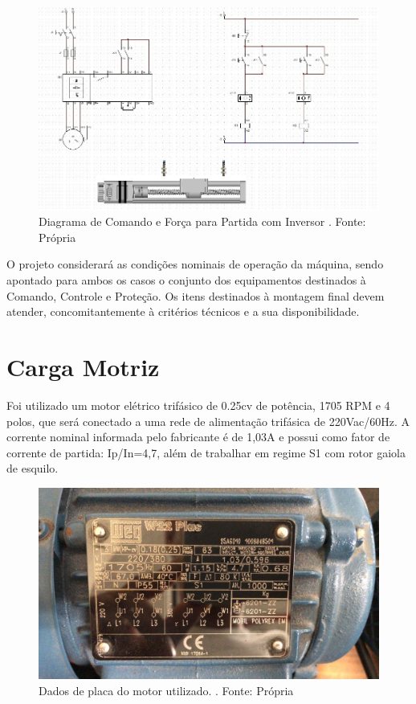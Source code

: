 \documentclass[a4paper, 12pt,oneside, english, brazil]{abntex2}
\begin{document}
\begin{figure}[H]
    \centering
    \includegraphics[scale=0.6]{esquema.jpg}
    \caption{Diagrama de Comando e Força para Partida com Inversor
. Fonte: Própria}
    \label{esquema}
\end{figure}
O projeto considerará as condições nominais de operação da máquina, sendo apontado para ambos os casos o conjunto dos equipamentos destinados à Comando, Controle e Proteção. Os itens destinados à montagem final devem atender, concomitantemente à critérios técnicos e a sua disponibilidade.

\section{Carga Motriz}
Foi utilizado um motor elétrico trifásico de 0.25cv de potência, 1705 RPM e 4 polos, que será conectado a uma rede de alimentação trifásica de 220Vac/60Hz. A corrente nominal informada pelo fabricante é de 1,03A e possui como fator de corrente de partida: Ip/In=4,7, além de trabalhar em regime S1 com rotor gaiola de esquilo.
\begin{figure}[H]
    \centering
    \includegraphics[scale=0.45]{motor.jpg}
    \caption{Dados de placa do motor utilizado.
. Fonte: Própria}
    \label{motooor}
\end{figure}
\end{document}
